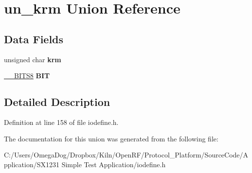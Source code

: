 \hypertarget{unionun__krm}{\section{un\-\_\-krm Union Reference}
\label{unionun__krm}
}
\subsection*{Data Fields}
\begin{DoxyCompactItemize}
\item 
\hypertarget{unionun__krm_aa283c9972cfb29fc7572ac2de2694b52}{unsigned char {\bfseries krm}}\label{unionun__krm_aa283c9972cfb29fc7572ac2de2694b52}

\item 
\hypertarget{unionun__krm_abaabe0403df0b11a2c660f9811c87638}{\hyperlink{struct_____b_i_t_s8}{\-\_\-\-\_\-\-B\-I\-T\-S8} {\bfseries B\-I\-T}}\label{unionun__krm_abaabe0403df0b11a2c660f9811c87638}

\end{DoxyCompactItemize}


\subsection{Detailed Description}


Definition at line 158 of file iodefine.\-h.



The documentation for this union was generated from the following file\-:\begin{DoxyCompactItemize}
\item 
C\-:/\-Users/\-Omega\-Dog/\-Dropbox/\-Kiln/\-Open\-R\-F/\-Protocol\-\_\-\-Platform/\-Source\-Code/\-Application/\-S\-X1231 Simple Test Application/iodefine.\-h\end{DoxyCompactItemize}
